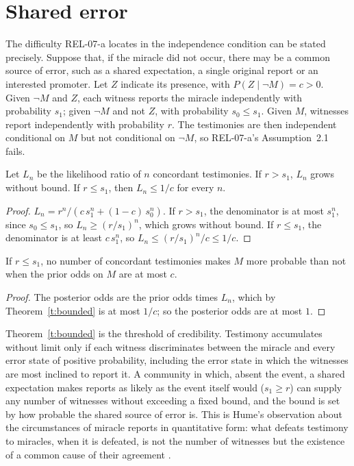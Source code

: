 \documentclass{situationist-preprint}
\begin{document}
\section{Shared error}

The difficulty REL-07-a locates in the independence condition can be stated precisely. Suppose that, if the miracle did not occur, there may be a common source of error, such as a shared expectation, a single original report or an interested promoter. Let $Z$ indicate its presence, with $P(Z \mid \neg M) = c > 0$. Given $\neg M$ and $Z$, each witness reports the miracle independently with probability $s_1$; given $\neg M$ and not $Z$, with probability $s_0 \leq s_1$. Given $M$, witnesses report independently with probability $r$. The testimonies are then independent conditional on $M$ but not conditional on $\neg M$, so REL-07-a's Assumption~2.1 fails.

\begin{theorem}\label{t:bounded}
Let $L_n$ be the likelihood ratio of $n$ concordant testimonies. If $r > s_1$, $L_n$ grows without bound. If $r \leq s_1$, then $L_n \leq 1/c$ for every $n$.
\end{theorem}

\begin{proof}
$L_n = r^n / (c\,s_1^n + (1-c)\,s_0^n)$. If $r > s_1$, the denominator is at most $s_1^n$, since $s_0 \leq s_1$, so $L_n \geq (r/s_1)^n$, which grows without bound. If $r \leq s_1$, the denominator is at least $c\,s_1^n$, so $L_n \leq (r/s_1)^n / c \leq 1/c$.
\end{proof}

\begin{corollary}\label{c:threshold}
If $r \leq s_1$, no number of concordant testimonies makes $M$ more probable than not when the prior odds on $M$ are at most $c$.
\end{corollary}

\begin{proof}
The posterior odds are the prior odds times $L_n$, which by Theorem~\ref{t:bounded} is at most $1/c$; so the posterior odds are at most $1$.
\end{proof}

Theorem~\ref{t:bounded} is the threshold of credibility. Testimony accumulates without limit only if each witness discriminates between the miracle and every error state of positive probability, including the error state in which the witnesses are most inclined to report it. A community in which, absent the event, a shared expectation makes reports as likely as the event itself would ($s_1 \geq r$) can supply any number of witnesses without exceeding a fixed bound, and the bound is set by how probable the shared source of error is. This is Hume's observation about the circumstances of miracle reports in quantitative form: what defeats testimony to miracles, when it is defeated, is not the number of witnesses but the existence of a common cause of their agreement \citep{Hume1748,Earman2000}.
\end{document}
